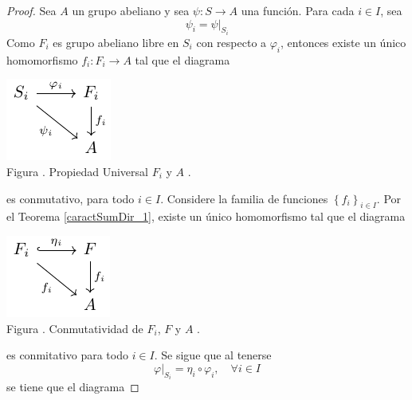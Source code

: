 \documentclass[12pt]{report}
\theoremstyle{largebreak}
\newcommand\cf[3]{\ensuremath{#1:#2\rightarrow#3}}
\newcounter{figcount}
\begin{document}
    \begin{proof}
        Sea $A$ un grupo abeliano y sea $\cf{\psi}{S}{A}$ una función. Para cada $i\in I$, sea
        \begin{equation*}
            \psi_i=\psi\big|_{S_i}
        \end{equation*}
        Como $F_i$ es grupo abeliano libre en $S_i$ con respecto a $\varphi_i$, entonces existe un único homomorfismo $\cf{f_i}{F_i}{A}$ tal que el diagrama
        
        \begin{minipage}{\textwidth}
            \begin{center}
                \includegraphics[scale=1.5]{images/fig_7.pdf}\\
                Figura \thefigcount. Propiedad Universal $F_i$ y $A$ .
            \end{center}
        \end{minipage}

        es conmutativo, para todo $i\in I$. Considere la familia de funciones $\left\{f_i \right\}_{i\in I}$. Por el Teorema \ref{caractSumDir_1}, existe un único homomorfismo tal que el diagrama

        \begin{minipage}{\textwidth}
            \begin{center}
                \includegraphics[scale=1.5]{images/fig_8.pdf}\\
                Figura \thefigcount. Conmutatividad de $F_i$, $F$ y $A$ .
            \end{center}
        \end{minipage}

        es conmitativo para todo $i\in I$. Se sigue que al tenerse
        \begin{equation*}
            \varphi\big|_{S_i}=\eta_i\circ\varphi_i,\quad\forall i\in I
        \end{equation*}
        se tiene que el diagrama


\end{proof}
\end{document}
